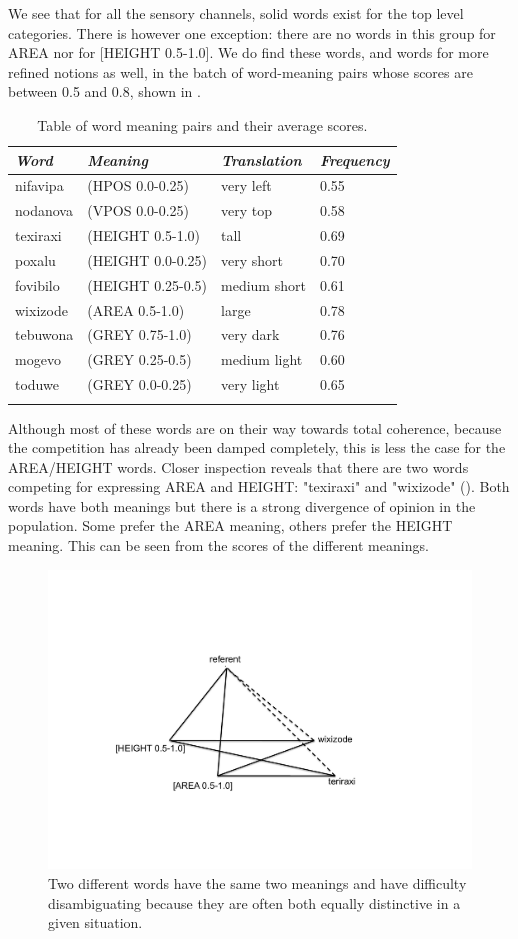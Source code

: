 We see that for all the sensory channels, solid words
exist for the top level categories. There is however
one exception: there are no words in this group for AREA
nor for [HEIGHT 0.5-1.0]. We do find these words, and 
words for more refined notions as well, in the 
batch of word-meaning pairs whose scores are between 0.5 and 0.8, shown 
in . 
\begin{table}
\begin{center}
\begin{tabular}{ l  l  l  l }
\lsptoprule
{\it Word}&{\it Meaning}& {\it Translation} & {\it Frequency} \\ \midrule
nifavipa & (HPOS 0.0-0.25) & very left & 0.55 \\ \midrule
nodanova & (VPOS 0.0-0.25) & very top & 0.58  \\ \midrule
texiraxi & (HEIGHT 0.5-1.0) & tall & 0.69  \\ \midrule
poxalu & (HEIGHT 0.0-0.25) & very short & 0.70  \\ \midrule
fovibilo & (HEIGHT 0.25-0.5) & medium short & 0.61  \\ \midrule
wixizode & (AREA 0.5-1.0) & large & 0.78  \\ \midrule
tebuwona & (GREY 0.75-1.0) & very dark & 0.76  \\ \midrule
mogevo & (GREY 0.25-0.5) & medium light & 0.60  \\ \midrule
toduwe & (GREY 0.0-0.25) & very light & 0.65  \\ \midrule
\lspbottomrule
\end{tabular}
\caption{\label{tab:freq} Table of word meaning pairs and their average scores.}
\end{center}
\end{table}
Although most of these words are on their way towards
total coherence, because the competition has already 
been damped completely, this is less the case for 
the AREA/HEIGHT words. Closer inspection reveals that 
there are two words competing for expressing
AREA and HEIGHT: "texiraxi" and "wixizode"
(). Both words have both meanings
but there is a strong divergence of opinion in the 
population. Some prefer the AREA meaning, others prefer
the HEIGHT meaning. This can be seen from the scores of 
the different meanings.
\begin{figure}[htbp]
  \centerline{\includegraphics[width=.60\textwidth]{chap6/figs/triangle7}}
\caption{\label{triangle7} Two different words have the 
same two meanings and have difficulty disambiguating because
they are often both equally distinctive in a given situation.}
\end{figure}
